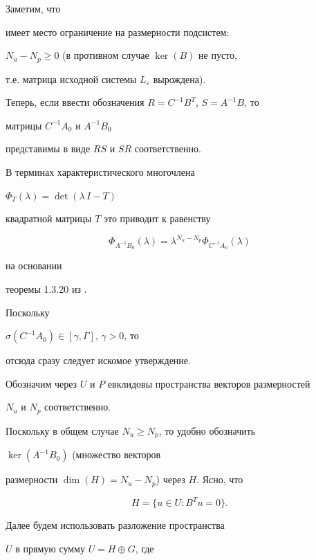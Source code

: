 \begin{pf}


Заметим, что


имеет место ограничение на размерности подсистем:


$N_u - N_p \geq 0 $ (в противном случае $\ker(B)$ не пусто,


т.е. матрица исходной системы $ L_{\varepsilon}$ вырождена).





Теперь, если ввести обозначения $ R = C^{-1}B^{T}$, $S=A^{-1}B$, то


матрицы $C^{-1}A_0$ и $A^{-1}B_0$


представимы в виде $RS$ и $SR$ соответственно.


В терминах характеристического многочлена


$\Phi_T(\lambda) = \det( \lambda \,I - T )$


квадратной матрицы $T$ это приводит к равенству


$$


\Phi_{A^{-1}B_0}(\lambda) = \lambda^{N_u - N_p} \Phi_{C^{-1}A_0}(\lambda)


$$


на основании


теоремы 1.3.20 из \cite{Horn}.


Поскольку


$\sigma (C^{-1}A_0 ) \in[\gamma,\Gamma]$, $\gamma > 0$, то


отсюда сразу следует искомое утверждение.


\end{pf}





Обозначим через $U$ и $P$ евклидовы пространства векторов размерностей


$N_u$ и $N_p$ соответственно.


Поскольку в общем случае $N_u \ge N_p$, то удобно обозначить


$\ker (A^{-1}B_0)$ (множество векторов


размерности $\dim(H) = N_u - N_p $) через $H$. Ясно, что


$$


H = \{u \in U : B^T u = 0 \}.


$$


Далее будем использовать разложение пространства


$U$ в прямую сумму $U = H \oplus G$, где


